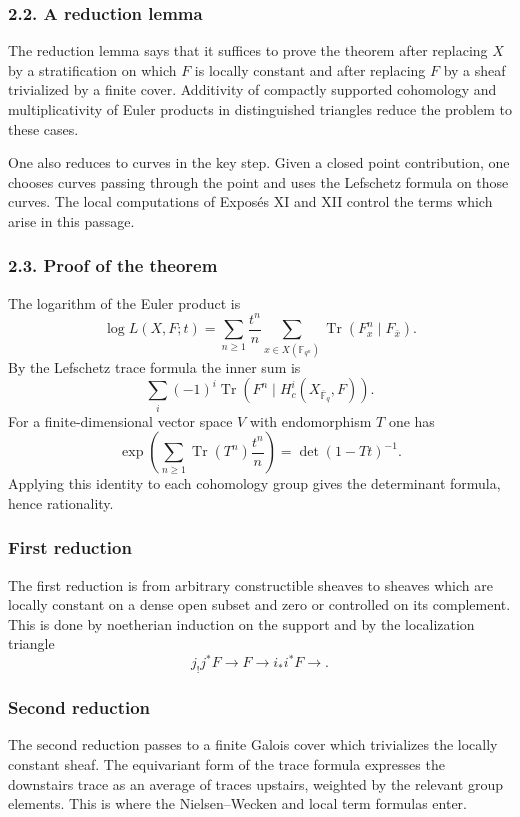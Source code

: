 \documentclass[11pt]{article}
\theoremstyle{plain}
\theoremstyle{definition}
\theoremstyle{remark}
\newcommand{\FF}{\mathbb F}
\begin{document}
\subsubsection*{2.2. A reduction lemma}

The reduction lemma says that it suffices to prove the theorem after replacing $X$ by a stratification on which $F$ is locally constant and after replacing $F$ by a sheaf trivialized by a finite cover. Additivity of compactly supported cohomology and multiplicativity of Euler products in distinguished triangles reduce the problem to these cases.

One also reduces to curves in the key step. Given a closed point contribution, one chooses curves passing through the point and uses the Lefschetz formula on those curves. The local computations of Expos\'es XI and XII control the terms which arise in this passage.

\subsubsection*{2.3. Proof of the theorem}

The logarithm of the Euler product is
\[
   \log L(X,F;t)=\sum_{n\ge1}\frac{t^n}{n}
       \sum_{x\in X(\FF_{q^n})}\operatorname{Tr}(F_x^n\mid F_{\bar x}).
\]
By the Lefschetz trace formula the inner sum is
\[
   \sum_i(-1)^i\operatorname{Tr}(F^n\mid H^i_c(X_{\overline{\FF}_q},F)).
\]
For a finite-dimensional vector space $V$ with endomorphism $T$ one has
\[
   \exp\left(\sum_{n\ge1}\operatorname{Tr}(T^n)\frac{t^n}{n}\right)
      =\det(1-Tt)^{-1}.
\]
Applying this identity to each cohomology group gives the determinant formula, hence rationality.

\subsubsection*{First reduction}

The first reduction is from arbitrary constructible sheaves to sheaves which are locally constant on a dense open subset and zero or controlled on its complement. This is done by noetherian induction on the support and by the localization triangle
\[
   j_!j^*F\to F\to i_*i^*F\to.
\]

\subsubsection*{Second reduction}

The second reduction passes to a finite Galois cover which trivializes the locally constant sheaf. The equivariant form of the trace formula expresses the downstairs trace as an average of traces upstairs, weighted by the relevant group elements. This is where the Nielsen--Wecken and local term formulas enter.
\end{document}
